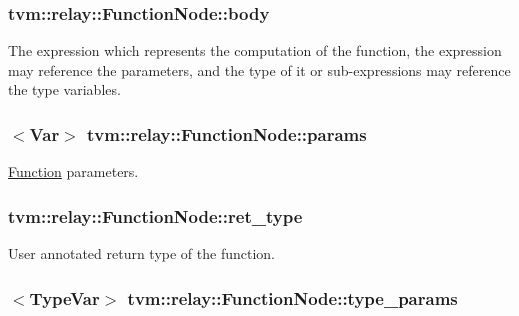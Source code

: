 \subsubsection[{\texorpdfstring{body}{body}}]{ tvm\+::relay\+::\+Function\+Node\+::body}\hypertarget{classtvm_1_1relay_1_1FunctionNode_a32687067886a6d94e798431a01d04949}{}\label{classtvm_1_1relay_1_1FunctionNode_a32687067886a6d94e798431a01d04949}


The expression which represents the computation of the function, the expression may reference the parameters, and the type of it or sub-\/expressions may reference the type variables. 

\subsubsection[{\texorpdfstring{params}{params}}]{$<${\bf Var}$>$ tvm\+::relay\+::\+Function\+Node\+::params}\hypertarget{classtvm_1_1relay_1_1FunctionNode_a689c5078fb501798aa1d57d1825e3b5a}{}\label{classtvm_1_1relay_1_1FunctionNode_a689c5078fb501798aa1d57d1825e3b5a}


\hyperlink{classtvm_1_1relay_1_1Function}{Function} parameters. 

\subsubsection[{\texorpdfstring{ret\+\_\+type}{ret_type}}]{ tvm\+::relay\+::\+Function\+Node\+::ret\+\_\+type}\hypertarget{classtvm_1_1relay_1_1FunctionNode_a075bcae369d873c24b7887eb7c96da40}{}\label{classtvm_1_1relay_1_1FunctionNode_a075bcae369d873c24b7887eb7c96da40}


User annotated return type of the function. 

\subsubsection[{\texorpdfstring{type\+\_\+params}{type_params}}]{$<${\bf Type\+Var}$>$ tvm\+::relay\+::\+Function\+Node\+::type\+\_\+params}\hypertarget{classtvm_1_1relay_1_1FunctionNode_a558ecb3ab57111b1a0f347764054d5e1}{}\label{classtvm_1_1relay_1_1FunctionNode_a558ecb3ab57111b1a0f347764054d5e1}



